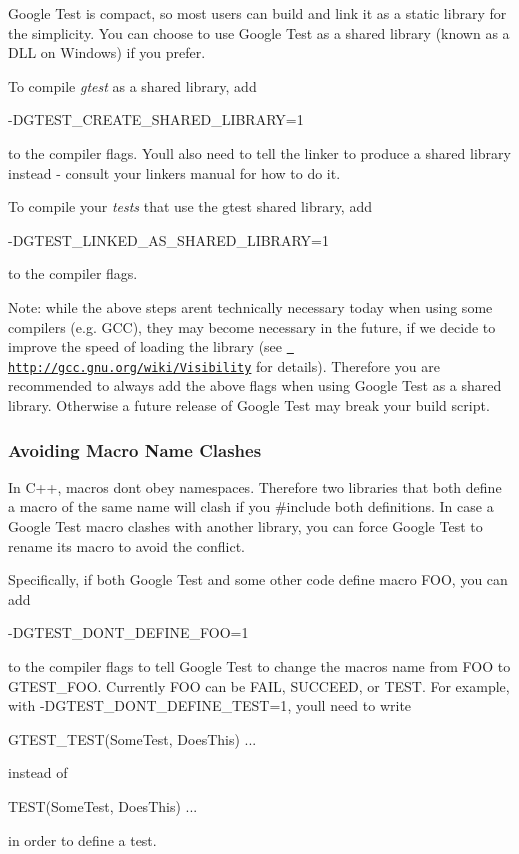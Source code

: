 Google Test is compact, so most users can build and link it as a static library for the simplicity. You can choose to use Google Test as a shared library (known as a D\+LL on Windows) if you prefer.

To compile {\itshape gtest} as a shared library, add \begin{DoxyVerb}-DGTEST_CREATE_SHARED_LIBRARY=1
\end{DoxyVerb}


to the compiler flags. You\textquotesingle{}ll also need to tell the linker to produce a shared library instead -\/ consult your linker\textquotesingle{}s manual for how to do it.

To compile your {\itshape tests} that use the gtest shared library, add \begin{DoxyVerb}-DGTEST_LINKED_AS_SHARED_LIBRARY=1
\end{DoxyVerb}


to the compiler flags.

Note\+: while the above steps aren\textquotesingle{}t technically necessary today when using some compilers (e.\+g. G\+CC), they may become necessary in the future, if we decide to improve the speed of loading the library (see \href{http://gcc.gnu.org/wiki/Visibility}{\texttt{ http\+://gcc.\+gnu.\+org/wiki/\+Visibility}} for details). Therefore you are recommended to always add the above flags when using Google Test as a shared library. Otherwise a future release of Google Test may break your build script.

\subsubsection*{Avoiding Macro Name Clashes}

In C++, macros don\textquotesingle{}t obey namespaces. Therefore two libraries that both define a macro of the same name will clash if you {\ttfamily \#include} both definitions. In case a Google Test macro clashes with another library, you can force Google Test to rename its macro to avoid the conflict.

Specifically, if both Google Test and some other code define macro F\+OO, you can add \begin{DoxyVerb}-DGTEST_DONT_DEFINE_FOO=1
\end{DoxyVerb}


to the compiler flags to tell Google Test to change the macro\textquotesingle{}s name from {\ttfamily F\+OO} to {\ttfamily G\+T\+E\+S\+T\+\_\+\+F\+OO}. Currently {\ttfamily F\+OO} can be {\ttfamily F\+A\+IL}, {\ttfamily S\+U\+C\+C\+E\+ED}, or {\ttfamily T\+E\+ST}. For example, with {\ttfamily -\/D\+G\+T\+E\+S\+T\+\_\+\+D\+O\+N\+T\+\_\+\+D\+E\+F\+I\+N\+E\+\_\+\+T\+E\+ST=1}, you\textquotesingle{}ll need to write \begin{DoxyVerb}GTEST_TEST(SomeTest, DoesThis) { ... }
\end{DoxyVerb}


instead of \begin{DoxyVerb}TEST(SomeTest, DoesThis) { ... }
\end{DoxyVerb}


in order to define a test. 